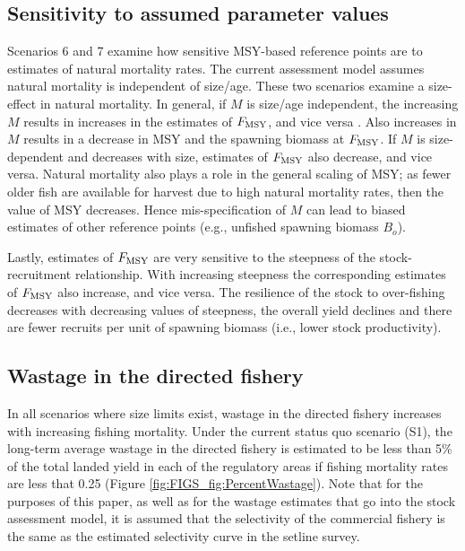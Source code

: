 \subsection*{Sensitivity to assumed parameter values} %
\label{sub:sensitivity_to_assumed_parameter_values}
Scenarios 6 and 7 examine how sensitive MSY-based reference points are to estimates of natural mortality rates.  The current assessment model assumes natural mortality is independent of size/age.  These two scenarios examine a size-effect in natural mortality.  In general, if $M$ is size/age independent, the increasing $M$ results in increases in the estimates of $F_{\rm{MSY}}$, and vice versa \citep{WalMart2004}.  Also increases in $M$ results in a decrease in MSY and the spawning biomass at $F_{\rm{MSY}}$.  If $M$ is size-dependent and decreases with size, estimates of $F_{\rm{MSY}}$  also decrease, and vice versa.  Natural mortality also plays a role in the general scaling of MSY; as fewer older fish are available for harvest due to high natural mortality rates, then the value of MSY decreases.  Hence mis-specification of $M$ can lead to biased estimates of other reference points (e.g., unfished spawning biomass $B_o$).

Lastly, estimates of $F_{\rm{MSY}}$ are very sensitive to the steepness of the stock-recruitment relationship.  With increasing steepness the corresponding estimates of $F_{\rm{MSY}}$ also increase, and vice versa.  The resilience of the stock to over-fishing decreases with decreasing values of steepness,  the overall yield declines and there are fewer recruits per unit of spawning biomass (i.e., lower stock productivity).


\subsection*{Wastage in the directed fishery} %
\label{sub:wastage_in_the_directed_fishery}

In all scenarios where size limits exist, wastage in the directed fishery increases with increasing fishing mortality.  Under the current status quo scenario (S1), the long-term average wastage in the directed fishery is estimated to be less than 5\% of the total landed yield in each of the regulatory areas if fishing mortality rates are  less that 0.25 (Figure \ref{fig:FIGS_fig:PercentWastage}). Note that for the purposes of this paper, as well as for the wastage estimates that go into the stock assessment model, it is assumed that the selectivity of the commercial fishery is the same as the estimated selectivity curve in the setline survey.

